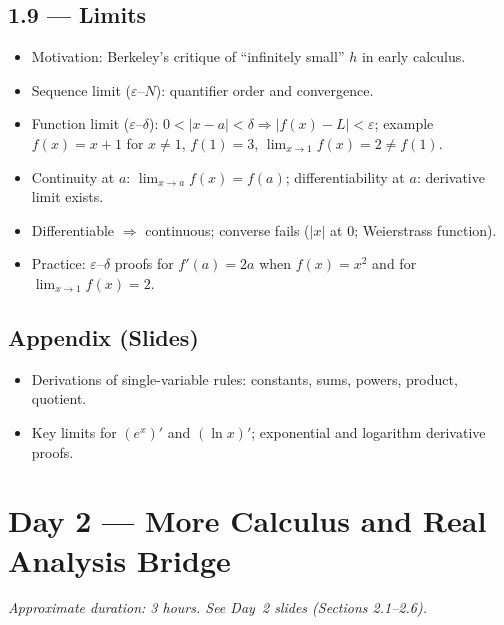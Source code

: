 \documentclass[11pt,a4paper]{article}
\begin{document}
\subsection{1.9 --- Limits}
\begin{itemize}[leftmargin=*]
    \item Motivation: Berkeley's critique of ``infinitely small'' $h$ in early calculus.
    \item Sequence limit ($\varepsilon$--$N$): quantifier order and convergence.
    \item Function limit ($\varepsilon$--$\delta$): $0<|x-a|<\delta\Rightarrow|f(x)-L|<\varepsilon$;
      example $f(x)=x+1$ for $x\neq 1$, $f(1)=3$, $\lim_{x\to 1}f(x)=2\neq f(1)$.
    \item Continuity at $a$: $\lim_{x\to a}f(x)=f(a)$;
      differentiability at $a$: derivative limit exists.
    \item Differentiable $\Rightarrow$ continuous; converse fails ($|x|$ at $0$; Weierstrass function).
    \item Practice: $\varepsilon$--$\delta$ proofs for $f'(a)=2a$ when $f(x)=x^2$ and for
      $\lim_{x\to 1}f(x)=2$.
\end{itemize}

\subsection{Appendix (Slides)}
\begin{itemize}[leftmargin=*]
    \item Derivations of single-variable rules: constants, sums, powers, product, quotient.
    \item Key limits for $(e^x)'$ and $(\ln x)'$; exponential and logarithm derivative proofs.
\end{itemize}

\section{Day 2 --- More Calculus and Real Analysis Bridge}

\textit{Approximate duration: 3 hours. See Day~2 slides (Sections 2.1--2.6).}
\end{document}

